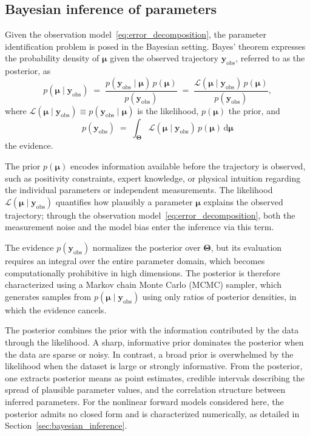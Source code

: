 \documentclass{elsarticle}
\renewcommand{\vec}[1]{\boldsymbol{#1}}
\newcommand{\params}{\boldsymbol{\mu}}
\newcommand{\paramspace}{\boldsymbol{\Theta}}
\begin{document}
\subsection{Bayesian inference of parameters}
\label{subsec:bayes_inverse}

Given the observation model~\eqref{eq:error_decomposition}, the
parameter identification problem is posed in the Bayesian setting.
Bayes' theorem expresses the probability density of $\params$ given
the observed trajectory $\vec{y}_{\mathrm{obs}}$, referred to as the
posterior, as
\begin{equation}
p(\params \mid \vec{y}_{\mathrm{obs}})
\;=\;
\frac{p(\vec{y}_{\mathrm{obs}} \mid \params)\,p(\params)}
     {p(\vec{y}_{\mathrm{obs}})}
\;=\;
\frac{\mathcal{L}(\params \mid \vec{y}_{\mathrm{obs}})\,p(\params)}
     {p(\vec{y}_{\mathrm{obs}})},
\label{eq:bayes_intro}
\end{equation}
where
$\mathcal{L}(\params \mid \vec{y}_{\mathrm{obs}})
 \equiv p(\vec{y}_{\mathrm{obs}} \mid \params)$
is the likelihood, $p(\params)$ the prior, and
\begin{equation}
p(\vec{y}_{\mathrm{obs}})
\;=\;
\int_{\paramspace}
\mathcal{L}(\params \mid \vec{y}_{\mathrm{obs}})\,p(\params)\,
\mathrm{d}\params
\label{eq:evidence}
\end{equation}
the evidence.

The prior $p(\params)$ encodes information available before the
trajectory is observed, such as positivity constraints, expert knowledge, or physical intuition regarding the individual parameters or independent measurements. The likelihood $\mathcal{L}(\params \mid \vec{y}_{\mathrm{obs}})$
quantifies how plausibly a parameter $\params$ explains the observed
trajectory; through the observation
model~\eqref{eq:error_decomposition}, both the measurement noise and
the model bias enter the inference via this term.

The evidence $p(\vec{y}_{\mathrm{obs}})$ normalizes the posterior over
$\paramspace$, but its evaluation requires an integral over the entire
parameter domain, which becomes computationally prohibitive in high
dimensions. The posterior is therefore characterized using a Markov
chain Monte Carlo (MCMC) sampler, which generates samples from
$p(\params \mid \vec{y}_{\mathrm{obs}})$ using only ratios of posterior
densities, in which the evidence cancels.

The posterior combines the prior with the information contributed by
the data through the likelihood. A sharp, informative prior dominates
the posterior when the data are sparse or noisy. In contrast, a broad prior
is overwhelmed by the likelihood when the dataset is large or strongly
informative. From the posterior, one extracts posterior means as point
estimates, credible intervals describing the spread of plausible
parameter values, and the correlation structure between inferred
parameters. For the nonlinear forward models considered here, the
posterior admits no closed form and is characterized numerically, as
detailed in Section~\ref{sec:bayesian_inference}.
\end{document}
